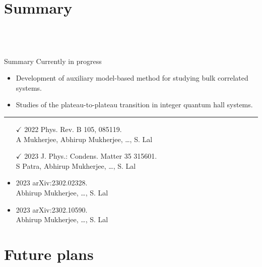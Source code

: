 \documentclass[12pt,aspectratio=169]{beamer}
\begin{document}
\section{Summary}
\subsection{~}

\begin{frame}{Summary}
\alert{Currently in progress}\\
\begin{itemize}
	\item Development of auxiliary model-based method for studying bulk correlated systems.\\[10pt]
	\item Studies of the plateau-to-plateau transition in integer quantum hall systems.
\end{itemize}

\vspace*{\fill}
\hrule

\vspace*{\fill}
\begin{minipage}{0.55\textwidth}
\begin{itemize}
	\item[$\checkmark$] 2022 \alert{Phys. Rev. B} 105, 085119.\\ A Mukherjee, \alert{Abhirup Mukherjee}, \ldots, S. Lal\\[10pt]
	\item[$\checkmark$] 2023 \alert{J. Phys.: Condens. Matter} 35 315601.\\ S Patra, \alert{Abhirup Mukherjee}, \ldots, S. Lal
\end{itemize}
\end{minipage}
\begin{minipage}{0.44\textwidth}
\begin{itemize}
	\item 2023 \alert{arXiv:2302.02328}.\\ \alert{Abhirup Mukherjee}, \ldots, S. Lal\\[10pt]
	\item 2023 \alert{arXiv:2302.10590}.\\ \alert{Abhirup Mukherjee}, \ldots, S. Lal
\end{itemize}
\end{minipage}

\end{frame}

\section{Future plans}
\end{document}
